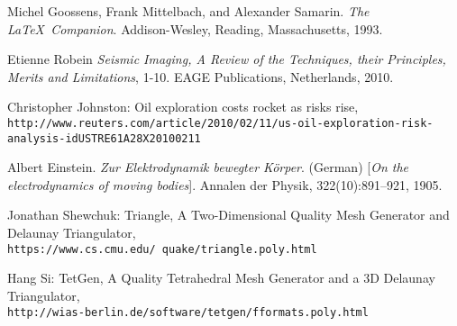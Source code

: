 
\newpage

\begin{thebibliography}{9}

Michel Goossens, Frank Mittelbach, and Alexander Samarin. 
\textit{The \LaTeX\ Companion}. 
Addison-Wesley, Reading, Massachusetts, 1993.

Etienne Robein
\textit{Seismic Imaging, A Review of the Techniques, their Principles, Merits and Limitations}, 1-10.
EAGE Publications, Netherlands, 2010.

Christopher Johnston: Oil exploration costs rocket as risks rise,
\\\texttt{http://www.reuters.com/article/2010/02/11/us-oil-exploration-risk-analysis-idUSTRE61A28X20100211}

Albert Einstein. 
\textit{Zur Elektrodynamik bewegter K{\"o}rper}. (German) [\textit{On the electrodynamics of moving bodies}]. 
Annalen der Physik, 322(10):891–921, 1905.

Jonathan Shewchuk: Triangle, A Two-Dimensional Quality Mesh Generator and Delaunay Triangulator,
\\\texttt{https://www.cs.cmu.edu/~quake/triangle.poly.html}

Hang Si: TetGen, A Quality Tetrahedral Mesh Generator and a 3D Delaunay Triangulator,
\\\texttt{http://wias-berlin.de/software/tetgen/fformats.poly.html}

\end{thebibliography}
